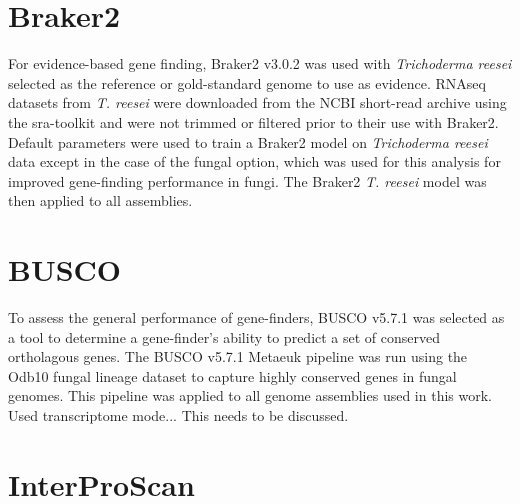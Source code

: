 \section{Braker2}

For evidence-based gene finding, Braker2 v3.0.2 was used with
\textit{Trichoderma reesei} selected as the reference or gold-standard
genome to use as evidence. RNAseq datasets from \textit{T. reesei}
were downloaded from the NCBI short-read archive using the sra-toolkit
and were not trimmed or filtered prior to their use with
Braker2. Default parameters were used to train a Braker2 model on
\textit{Trichoderma reesei} data except in the case of the fungal
option, which was used for this analysis for improved gene-finding
performance in fungi. The Braker2 \textit{T. reesei} model was then
applied to all assemblies.


\section{BUSCO}

To assess the general performance of gene-finders, BUSCO v5.7.1 was
selected as a tool to determine a gene-finder's ability to predict a
set of conserved ortholagous genes. The BUSCO v5.7.1 Metaeuk pipeline
was run using the Odb10 fungal lineage dataset to capture highly
conserved genes in fungal genomes. This pipeline was applied to all
genome assemblies used in this work. Used transcriptome mode... This needs to be discussed.

\section{InterProScan}

